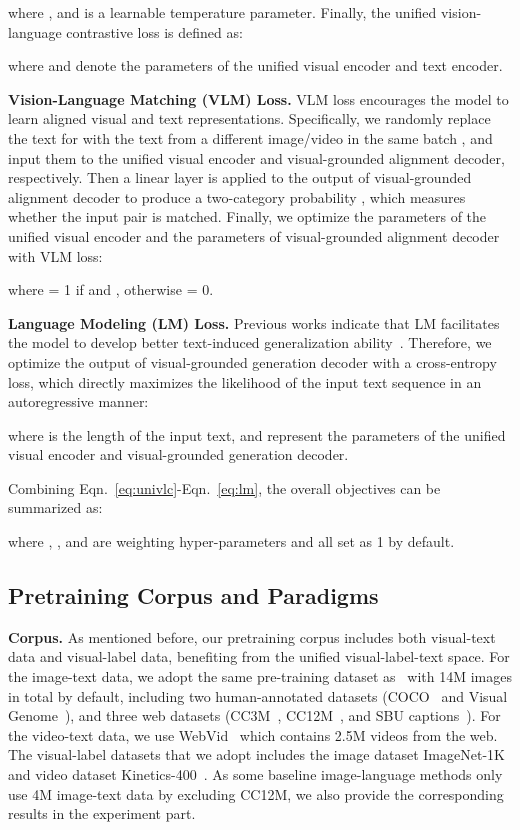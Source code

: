 \documentclass{article}
\begin{document}
where , and  is a learnable temperature parameter. Finally, the unified vision-language contrastive loss is defined as:

where  and  denote the parameters of the unified visual encoder and text encoder.

\noindent \textbf{Vision-Language Matching (VLM) Loss.} VLM loss encourages the model to learn aligned visual and text representations. Specifically, we randomly replace the text  for  with
the text  from a different image/video in the same batch , and input them to the unified visual encoder and visual-grounded alignment decoder, respectively. Then a linear layer is applied to the output of visual-grounded alignment decoder to produce a two-category probability , which measures whether the input pair is matched. Finally, we optimize the parameters of the unified visual encoder  and the parameters of visual-grounded alignment decoder  with VLM loss:


where  = 1 if  and , otherwise  = 0. 

\vspace{0.05in}
\noindent \textbf{Language Modeling (LM) Loss.} Previous works indicate that LM facilitates the model to develop better text-induced generalization ability~\cite{wang2022simvlm}. Therefore, we optimize the output of visual-grounded generation decoder with a cross-entropy loss, which directly maximizes the likelihood of the input text sequence in an autoregressive manner:

where  is the length of the input text,  and  represent the parameters of the unified visual encoder and visual-grounded generation decoder.

Combining Eqn.~\ref{eq:univlc}-Eqn.~\ref{eq:lm}, the overall objectives can be summarized as:

where , , and  are weighting hyper-parameters and all set as 1 by default.

\subsection{Pretraining Corpus and Paradigms}
\label{sec:data}
\noindent \textbf{Corpus.} As mentioned before, our pretraining corpus includes both visual-text data and visual-label data, benefiting from the unified visual-label-text space. For the image-text data, we adopt the same pre-training dataset as~\cite{li2021align,li2022blip} with 14M images in total by default, including two human-annotated datasets
(COCO~\cite{lin2014microsoft} and Visual Genome~\cite{krishna2017visual}), and three web datasets (CC3M~\cite{sharma2018conceptual}, CC12M~\cite{changpinyo2021conceptual}, and SBU captions~\cite{ordonez2011im2text}). For the video-text data, we use WebVid~\cite{bain2021frozen} which contains 2.5M videos from the web. The visual-label datasets that we adopt includes the image dataset ImageNet-1K~\cite{deng2009imagenet} and video dataset Kinetics-400~\cite{kay2017kinetics}. As some baseline image-language methods only use 4M image-text data by excluding CC12M, we also provide the corresponding results in the experiment part. 
\end{document}
